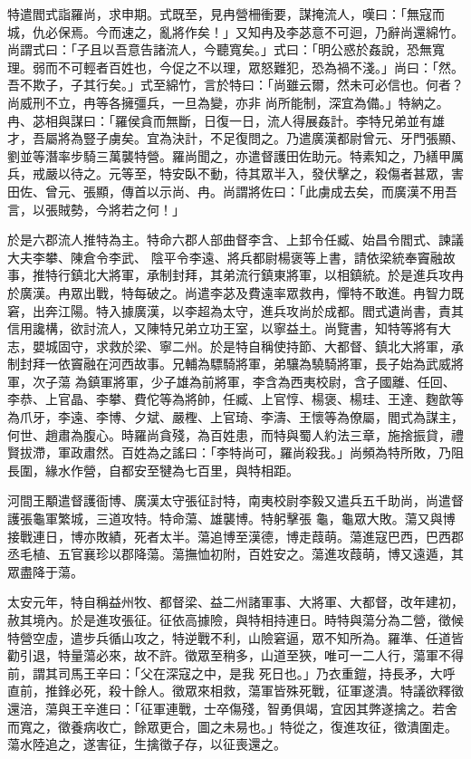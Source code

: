 \begin{pinyinscope}
 特遣閻式詣羅尚，求申期。式既至，見冉營柵衝要，謀掩流人，嘆曰：「無寇而城，仇必保焉。今而速之，亂將作矣！」又知冉及李苾意不可迴，乃辭尚還綿竹。尚謂式曰：「子且以吾意告諸流人，今聽寬矣。」式曰：「明公惑於姦說，恐無寬理。弱而不可輕者百姓也，今促之不以理，眾怒難犯，恐為禍不淺。」尚曰：「然。吾不欺子，子其行矣。」式至綿竹，言於特曰：「尚雖云爾，然未可必信也。何者？尚威刑不立，冉等各擁彊兵，一旦為變，亦非
 尚所能制，深宜為備。」特納之。冉、苾相與謀曰：「羅侯貪而無斷，日復一日，流人得展姦計。李特兄弟並有雄才，吾屬將為豎子虜矣。宜為決計，不足復問之。乃遣廣漢都尉曾元、牙門張顯、劉並等潛率步騎三萬襲特營。羅尚聞之，亦遣督護田佐助元。特素知之，乃繕甲厲兵，戒嚴以待之。元等至，特安臥不動，待其眾半入，發伏擊之，殺傷者甚眾，害田佐、曾元、張顯，傳首以示尚、冉。尚謂將佐曰：「此虜成去矣，而廣漢不用吾言，以張賊勢，今將若之何！」



 於是六郡流人推特為主。特命六郡人部曲督李含、上邽令任臧、始昌令閻式、諫議大夫李攀、陳倉令李武、
 陰平令李遠、將兵都尉楊褒等上書，請依梁統奉竇融故事，推特行鎮北大將軍，承制封拜，其弟流行鎮東將軍，以相鎮統。於是進兵攻冉於廣漢。冉眾出戰，特每破之。尚遣李苾及費遠率眾救冉，憚特不敢進。冉智力既窘，出奔江陽。特入據廣漢，以李超為太守，進兵攻尚於成都。閻式遺尚書，責其信用讒構，欲討流人，又陳特兄弟立功王室，以寧益土。尚覽書，知特等將有大志，嬰城固守，求救於梁、寧二州。於是特自稱使持節、大都督、鎮北大將軍，承制封拜一依竇融在河西故事。兄輔為驃騎將軍，弟驤為驍騎將軍，長子始為武威將軍，次子蕩
 為鎮軍將軍，少子雄為前將軍，李含為西夷校尉，含子國離、任回、李恭、上官晶、李攀、費佗等為將帥，任臧、上官惇、楊褒、楊珪、王達、麴歆等為爪牙，李遠、李博、夕斌、嚴檉、上官琦、李濤、王懷等為僚屬，閻式為謀主，何世、趙肅為腹心。時羅尚貪殘，為百姓患，而特與蜀人約法三章，施捨振貸，禮賢拔滯，軍政肅然。百姓為之謠曰：「李特尚可，羅尚殺我。」尚頻為特所敗，乃阻長圍，緣水作營，自都安至犍為七百里，與特相距。



 河間王顒遣督護衙博、廣漢太守張征討特，南夷校尉李毅又遣兵五千助尚，尚遣督護張龜軍繁城，三道攻特。特命蕩、雄襲博。特躬擊張
 龜，龜眾大敗。蕩又與博接戰連日，博亦敗績，死者太半。蕩追博至漢德，博走葭萌。蕩進寇巴西，巴西郡丞毛植、五官襄珍以郡降蕩。蕩撫恤初附，百姓安之。蕩進攻葭萌，博又遠遁，其眾盡降于蕩。



 太安元年，特自稱益州牧、都督梁、益二州諸軍事、大將軍、大都督，改年建初，赦其境內。於是進攻張征。征依高據險，與特相持連日。時特與蕩分為二營，徵候特營空虛，遣步兵循山攻之，特逆戰不利，山險窘逼，眾不知所為。羅準、任道皆勸引退，特量蕩必來，故不許。徵眾至稍多，山道至狹，唯可一二人行，蕩軍不得前，謂其司馬王辛曰：「父在深寇之中，是我
 死日也。」乃衣重鎧，持長矛，大呼直前，推鋒必死，殺十餘人。徵眾來相救，蕩軍皆殊死戰，征軍遂潰。特議欲釋徵還涪，蕩與王辛進曰：「征軍連戰，士卒傷殘，智勇俱竭，宜因其弊遂擒之。若舍而寬之，徵養病收亡，餘眾更合，圖之未易也。」特從之，復進攻征，徵潰圍走。蕩水陸追之，遂害征，生擒徵子存，以征喪還之。




\end{pinyinscope}
